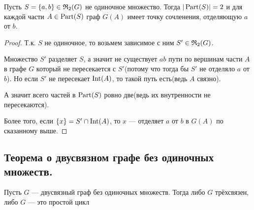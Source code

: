 \begin{customlm}{2.3} \label{lemma:2_3}
	Пусть $S = \{ a, b \} \in \mathfrak{R}_2(G)$ не одиночное множество.
	Тогда $|\operatorname{Part}(S)| = 2$ и для каждой части $A \in \operatorname{Part}(S)$ граф $G(A)$ имеет точку сочленения, отделяющую $a$ от $b$.
\end{customlm}

\begin{proof}
	Т.к. $S$ не одиночное, то возьмем зависимое с ним $S' \in \mathfrak{R}_2(G)$.

	Множество $S'$ разделяет $S$, а значит не существует $ab$ пути по вершинам части $A$ в графе $G$ который не пересекается с $S'$(потому что тогда бы $S'$ не отделяло $a$ от $b$).
	Но если $S'$ не пересекает $\operatorname{Int}(A)$, то такой путь есть(ведь $A$ связно).

	А значит всего частей в $\operatorname{Part}(S)$ ровно две(ведь их внутренности не пересекаются).

	Более того, если $\{x\} = S' \cap \operatorname{Int}(A)$, то $x$ — отделяет $a$ от $b$ в $G(A)$ по сказанному выше.
	
\end{proof}

\subsection{Теорема о двусвязном графе без одиночных множеств.}

\begin{customthm}{2.1} \label{theorem:2_1}
	Пусть $G$ — двусвязный граф без одиночных множеств.
	Тогда либо $G$ трёхсвязен, либо $G$ — это простой цикл
\end{customthm}

